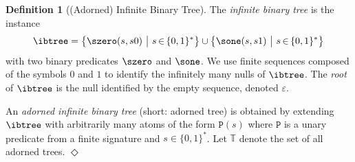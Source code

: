 \documentclass[10pt,a4paper]{amsart}
\theoremstyle{definition}
\numberwithin{equation}{section}
\theoremstyle{plain}
\theoremstyle{definition}
\newtheorem{definition}[definition]{Definition}
\theoremstyle{myexample}
\theoremstyle{plain}
\theoremstyle{definition}
\newcommand{\pred}[1]{\mathtt{#1}}
\newcommand{\defend}{\hfill\ensuremath{\Diamond}}
\begin{document}
\begin{definition}[(Adorned) Infinite Binary Tree]
	The \emph{infinite binary tree} is the instance
	$$\ibtree = 
    \big\{\szero(s,s0) \ \big| \ s {\,\in\,} \{0,1\}^*\big\} \cup 
	\big\{ \sone(s,s1) \ \big| \ s {\,\in\,} \{0,1\}^*\big\}
	$$%
	with two binary predicates $\szero$ and $\sone$.
	We use finite sequen\-ces composed of the symbols $0$ and $1$ to identify the infinitely many nulls of $\ibtree$. The \emph{root} of $\ibtree$ is the null identified by the empty sequence, denoted $\varepsilon$.

    An \emph{adorned infinite binary tree} (short: adorned tree) is obtained by extending $\ibtree$ with arbitrarily many atoms of the form $\pred{P}(s)$ where $\pred{P}$ is a unary predicate from a finite signature and $s \in \{0,1\}^*$. Let $\mathbb{T}$ denote the set of all adorned trees. 
    \defend
%
\end{definition}
\end{document}
